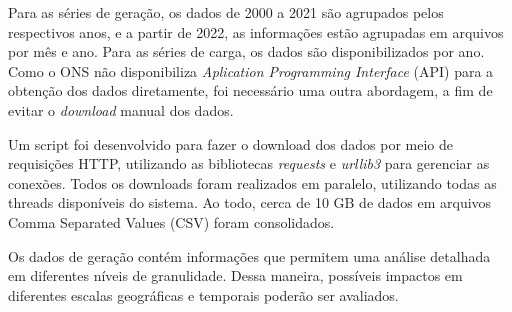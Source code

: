 Para as séries de geração, os dados de 2000 a 2021 são agrupados pelos respectivos anos, e a partir de 2022,
as informações estão agrupadas em arquivos por mês e ano. Para as séries de carga, os dados são disponibilizados por
ano. Como o ONS não disponibiliza \textit{Aplication Programming Interface} (API) para a obtenção dos dados diretamente, foi 
necessário uma outra abordagem, a fim de evitar o \textit{download} manual dos dados. 

Um script foi desenvolvido para fazer o download dos dados por meio de requisições HTTP, utilizando as bibliotecas 
\textit{requests} e \textit{urllib3} para gerenciar as conexões. Todos os downloads foram realizados em paralelo, utilizando 
todas as threads disponíveis do sistema. Ao todo, cerca de 10 GB de dados em arquivos Comma Separated Values (CSV) foram consolidados.


\begin{table}[htb]
  \centering
\end{table}

Os dados de geração contém informações que permitem uma análise detalhada em diferentes níveis de granulidade. Dessa maneira, 
possíveis impactos em diferentes escalas geográficas e temporais poderão ser avaliados.


